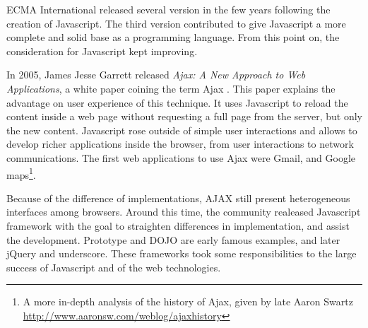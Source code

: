 
ECMA International released several version in the few years following the creation of Javascript.
The third version %
contributed to give Javascript a more complete and solid base as a programming language.
From this point on, the consideration for Javascript kept improving.

In 2005, James Jesse Garrett released \textit{Ajax: A New Approach to Web Applications}, a white paper coining the term Ajax \cite{Garrett2005}.
This paper explains the advantage on user experience of this technique.
It uses Javascript to reload the content inside a web page without requesting a full page from the server, but only the new content.
Javascript rose outside of simple user interactions and allows to develop richer applications inside the browser, from user interactions to network communications.
The first web applications to use Ajax were Gmail, and Google maps\footnote{A more in-depth analysis of the history of Ajax, given by late Aaron Swartz \url{http://www.aaronsw.com/weblog/ajaxhistory}}.

Because of the difference of implementations, AJAX still present heterogeneous interfaces among browsers.
Around this time, the community realeased Javascript framework with the goal to straighten differences in implementation, and assist the development.
Prototype and DOJO are early famous examples, and later jQuery and underscore.
These frameworks took some responsibilities to the large success of Javascript and of the web technologies.


